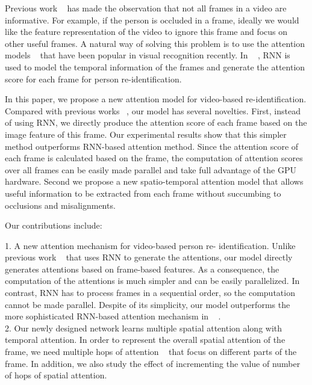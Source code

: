 \documentclass[sigconf, authordraft,review=false]{acmart}
\begin{document}
Previous work ~\cite{xu17_iccv,zhou17_cvpr} has made the observation that not all frames in a video are informative. For example, if the person is occluded in a frame, ideally we would like the feature representation of the video to ignore this frame and focus on other useful frames. A natural way of solving this problem is to use the attention models  ~\cite{bahdanau15_iclr,shih16_cvpr,xu15_icml} that  have  been  popular  in  visual  recognition  recently. In ~\cite{xu17_iccv,zhou17_cvpr}
, RNN is used to model the temporal information of the frames and generate the attention score for each frame for person re-identification.

In  this  paper,  we  propose  a  new  attention  model  for video-based  re-identification.
Compared  with  previous works ~\cite{xu17_iccv,zhou17_cvpr}, our model has several novelties.  First, instead of using RNN, we directly produce the attention score of each frame based on the image feature of this frame. Our experimental results show that this simpler method outperforms  RNN-based  attention  method.   Since  the  attention score of each frame is calculated based on the frame,  the computation of attention scores over all frames can be easily made parallel and take full advantage of the GPU hardware. Second we propose a new spatio-temporal attention model that allows useful information to be extracted from each frame without succumbing to occlusions and misalignments.

Our contributions include:

1.  A new attention mechanism for video-based person  re-
identification. Unlike  previous  work ~\cite{zhou17_cvpr}  that uses  RNN  to  generate  the  attentions,  our  model  directly generates attentions based on frame-based features. As a consequence, the computation of the attentions is much simpler and can be easily parallelized.
In contrast, RNN has to process frames in a sequential order, so the computation cannot be made parallel. Despite of its simplicity, our model outperforms the more sophisticated RNN-based attention mechanism in ~\cite{zhou17_cvpr} .\\

2. Our newly designed network learns multiple spatial attention along with temporal attention. In order to represent the overall 
spatial attention of the frame, we need multiple hops of attention ~\cite{lin2017structured} that focus on different parts of the frame. In addition, we also study the effect of incrementing the value of number of hops of spatial attention.
\end{document}
